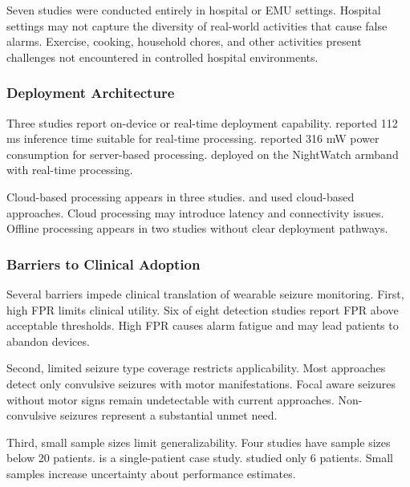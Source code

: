 Seven studies were conducted entirely in hospital or EMU settings. Hospital settings may not capture the diversity of real-world activities that cause false alarms. Exercise, cooking, household chores, and other activities present challenges not encountered in controlled hospital environments.

\subsubsection{Deployment Architecture}

Three studies report on-device or real-time deployment capability. \textcite{spahrDeepLearningbasedDetection2025} reported 112 ms inference time suitable for real-time processing. \textcite{borujenyDetectionEpilepticSeizure2013} reported 316 mW power consumption for server-based processing. \textcite{dongTwoLayerEnsembleMethod2022} deployed on the NightWatch armband with real-time processing.

Cloud-based processing appears in three studies. \textcite{nasseriAmbulatorySeizureForecasting2021} and \textcite{odeDevelopmentEpilepticSeizure2023} used cloud-based approaches. Cloud processing may introduce latency and connectivity issues. Offline processing appears in two studies without clear deployment pathways.

\subsubsection{Barriers to Clinical Adoption}

Several barriers impede clinical translation of wearable seizure monitoring. First, high FPR limits clinical utility. Six of eight detection studies report FPR above acceptable thresholds. High FPR causes alarm fatigue and may lead patients to abandon devices.

Second, limited seizure type coverage restricts applicability. Most approaches detect only convulsive seizures with motor manifestations. Focal aware seizures without motor signs remain undetectable with current approaches. Non-convulsive seizures represent a substantial unmet need.

Third, small sample sizes limit generalizability. Four studies have sample sizes below 20 patients. \textcite{singhrathoreDevelopmentMultimodalMachine2024} is a single-patient case study. \textcite{nasseriAmbulatorySeizureForecasting2021} studied only 6 patients. Small samples increase uncertainty about performance estimates.

